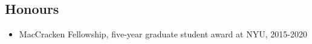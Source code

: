 \documentclass[a4paper,12pt]{article}
\begin{document}
\subsection{Honours}
\begin{itemize}[leftmargin=*,noitemsep]
\item MacCracken Fellowship, five-year graduate student award at NYU, 2015-2020
\end{itemize}
\end{document}
